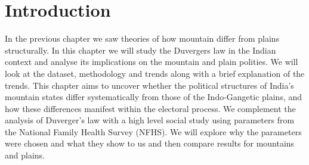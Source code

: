 \section{Introduction}
In the previous chapter we saw theories of how mountain differ from plains structurally. In this chapter we will study the Duvergers law in the Indian context and analyse its implications on the mountain and plain polities.  We will look at the dataset, methodology and trends along with a brief explanation of the trends. This chapter aims to uncover whether the political structures of India's mountain states differ systematically from those of the Indo-Gangetic plains, and how these differences manifest within the electoral process.  We complement the analysis of Duverger's law with a high level social study using parameters from the National Family Health Survey (NFHS). We will explore why the parameters were chosen and what they show to us and then compare results for mountains and plains.
